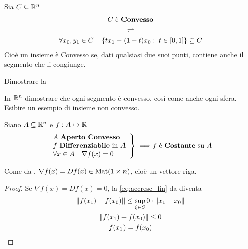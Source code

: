 \begin{definition}
	\label{def:convesso}
	Sia $C \subseteq \mathbb{R}^n$
	\begin{equation*}
		\begin{gathered}
			C \text{ è \textbf{Convesso}}\\
			\rightleftharpoons\\
			\forall x_0,y_1 \in C \quad \left\{tx_1+(1-t)x_0:\; t \in \left[0,1\right]\right\} \subseteq C
		\end{gathered}
	\end{equation*}
	Cioè un insieme è Convesso se, dati qualsiasi due suoi punti, contiene anche il segmento che li congiunge.
\end{definition}
\begin{exercise}
	Dimostrare la 
\end{exercise}
\begin{exercise}
	In $\mathbb{R}^n$ dimostrare che ogni segmento è convesso, così come anche ogni sfera.\\
	Esibire un esempio di insieme non convesso.
\end{exercise}
\begin{corollary}
	\label{coro:convess_nabla_0_f_const}
	Siano $A \subseteq \mathbb{R}^n$ e $f: A \mapsto \mathbb{R}$
	\[
		\left.
			\begin{array}{l}
				A \text{ \textbf{Aperto Convesso}}\\
				f \text{ \textbf{Differenziabile} in } A\\
				\forall x \in A \quad \nabla f(x) = 0
			\end{array}
		\right\}
		\implies\\
		f \text{ è \textbf{Costante} su } A
	\]
	\vspace*{-\baselineskip}
	\begin{note}
		Come da , $\nabla f(x) = Df(x) \in \operatorname{Mat} (1 \times n)$, cioè un vettore riga.
	\end{note}
	\begin{proof}
		Se $\nabla f(x) = Df(x) = 0$, la \cref{eq:accresc_fin} da  diventa
		\begin{equation*}
			\begin{gathered}
				\left\|f(x_1) - f(x_0)\right\| \leq \sup\limits_{\xi \in S} 0 \cdot \left\|x_1-x_0\right\|\\
				\left\|f(x_1) - f(x_0)\right\| \leq 0\\
				f(x_1) = f(x_0)
			\end{gathered}
		\end{equation*}
	\end{proof}
\end{corollary}
